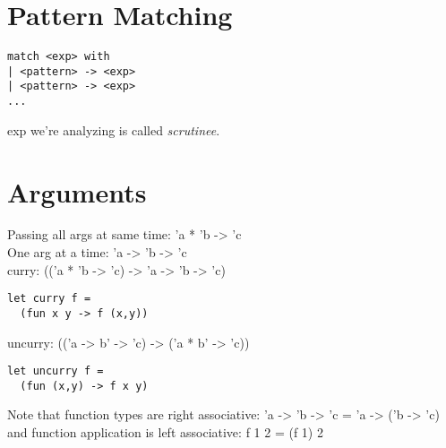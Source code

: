 \color{Cyan}
\section{Pattern Matching}
\begin{lstlisting}
match <exp> with
| <pattern> -> <exp>
| <pattern> -> <exp>
...
\end{lstlisting}
exp we're analyzing is called \textit{scrutinee}.
\color{Orange}
\section{Arguments}
Passing all args at same time: 'a * 'b -> 'c
\\ One arg at a time: 'a -> 'b -> 'c
\\curry: (('a * 'b -> 'c) -> 'a -> 'b -> 'c)
\begin{lstlisting}
let curry f =
  (fun x y -> f (x,y))
\end{lstlisting}
uncurry: (('a -> b' -> 'c) -> ('a * b' -> 'c))
\begin{lstlisting}
let uncurry f =
  (fun (x,y) -> f x y)
\end{lstlisting}
Note that function types are right associative: 'a -> 'b -> 'c = 'a ->
('b -> 'c) and function application is left associative: f 1 2 = (f 1) 2
\color{Magenta}
